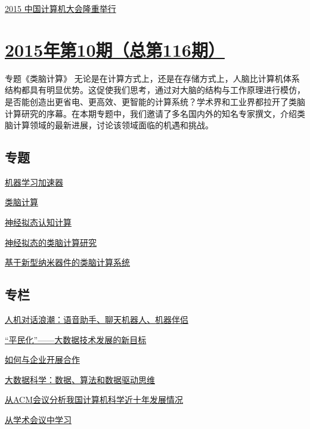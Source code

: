 \documentclass[a4paper]{article}
\begin{document}
\href{http://history.ccf.org.cn/resources/1190201776262/2015/11/12/1.pdf}{2015 中国计算机大会隆重举行}


\section{\href{http://history.ccf.org.cn/sites/ccf/jsjtbbd.jsp?contentId=2889262034952}{\textbf{2015年第10期（总第116期）}}}
专题《类脑计算》
无论是在计算方式上，还是在存储方式上，人脑比计算机体系结构都具有明显优势。这促使我们思考，通过对大脑的结构与工作原理进行模仿，是否能创造出更省电、更高效、更智能的计算系统？学术界和工业界都拉开了类脑计算研究的序幕。在本期专题中，我们邀请了多名国内外的知名专家撰文，介绍类脑计算领域的最新进展，讨论该领域面临的机遇和挑战。
\subsection{专题}
\href{http://history.ccf.org.cn/resources/1190201776262/2015/10/12/5.pdf}{机器学习加速器}

\href{http://history.ccf.org.cn/resources/1190201776262/2015/10/12/1.pdf}{类脑计算}

\href{http://history.ccf.org.cn/resources/1190201776262/2015/10/12/4.pdf}{神经拟态认知计算}

\href{http://history.ccf.org.cn/resources/1190201776262/2015/10/12/2.pdf}{神经拟态的类脑计算研究}

\href{http://history.ccf.org.cn/resources/1190201776262/2015/10/12/3.pdf}{基于新型纳米器件的类脑计算系统}

\subsection{专栏}
\href{http://history.ccf.org.cn/resources/1190201776262/2015/10/12/7.pdf}{人机对话浪潮：语音助手、聊天机器人、机器伴侣}

\href{http://history.ccf.org.cn/resources/1190201776262/2015/10/12/10.pdf}{“平民化”——大数据技术发展的新目标}

\href{http://history.ccf.org.cn/resources/1190201776262/2015/10/12/8.pdf}{如何与企业开展合作}

\href{http://history.ccf.org.cn/resources/1190201776262/2015/10/12/9.pdf}{大数据科学：数据、算法和数据驱动思维}

\href{http://history.ccf.org.cn/resources/1190201776262/2015/10/12/6.pdf}{从ACM会议分析我国计算机科学近十年发展情况}

\href{http://history.ccf.org.cn/resources/1190201776262/2015/10/12/11.pdf}{从学术会议中学习}
\end{document}
